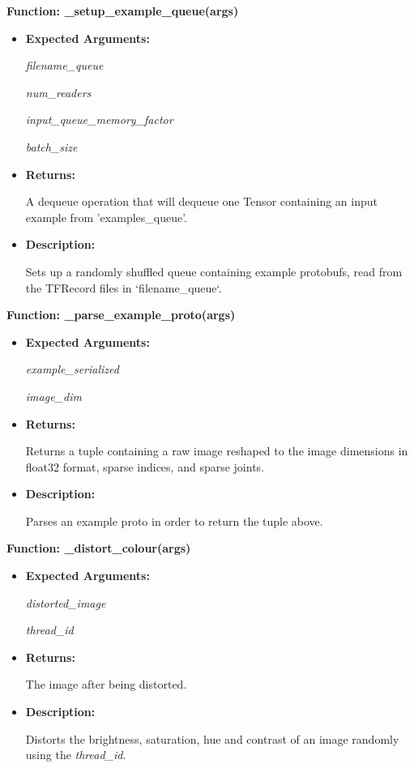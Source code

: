 \documentclass{scrreprt}
\begin{document}
\textbf{Function: \_setup\_example\_queue(args)}
\begin{itemize}
    \item \textbf{Expected Arguments:}

            \quad\textit{filename\_queue}

            \quad\textit{num\_readers}

            \quad\textit{input\_queue\_memory\_factor}

            \quad\textit{batch\_size}

    \item \textbf{Returns:}

            A dequeue operation that will dequeue one Tensor containing  an input example from 'examples\_queue'.        

    \item \textbf{Description:}

            Sets up a randomly shuffled queue containing example protobufs, read from the TFRecord files in `filename\_queue`.

\end{itemize}

\textbf{Function: \_parse\_example\_proto(args)}
\begin{itemize}
    \item \textbf{Expected Arguments:}

            \quad\textit{example\_serialized}

            \quad\textit{image\_dim}

    \item \textbf{Returns:}

            Returns a tuple containing a raw image reshaped to the image dimensions in float32 format, sparse indices, and sparse joints.

    \item \textbf{Description:}

            Parses an example proto in order to return the tuple above.

\end{itemize}

\textbf{Function: \_distort\_colour(args)}
\begin{itemize}
    \item \textbf{Expected Arguments:}

            \quad\textit{distorted\_image}

            \quad\textit{thread\_id}

    \item \textbf{Returns:}

            The image after being distorted.

    \item \textbf{Description:}

            Distorts the brightness, saturation, hue and contrast of an image randomly using the \textit{thread\_id}. 
\end{itemize}
\end{document}
